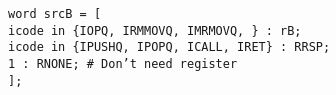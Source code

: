 \documentclass{article}
\begin{document}
\texttt{word srcB = [ \\
	\hspace*{17mm}icode in \{IOPQ, IRMMOVQ, IMRMOVQ, \} : rB; \\
	\hspace*{17mm}icode in \{IPUSHQ, IPOPQ, ICALL, IRET\} : RRSP; \\
	\hspace*{17mm}1 : RNONE; \# Don't need register \\
\hspace*{5mm}];}
\end{document}
